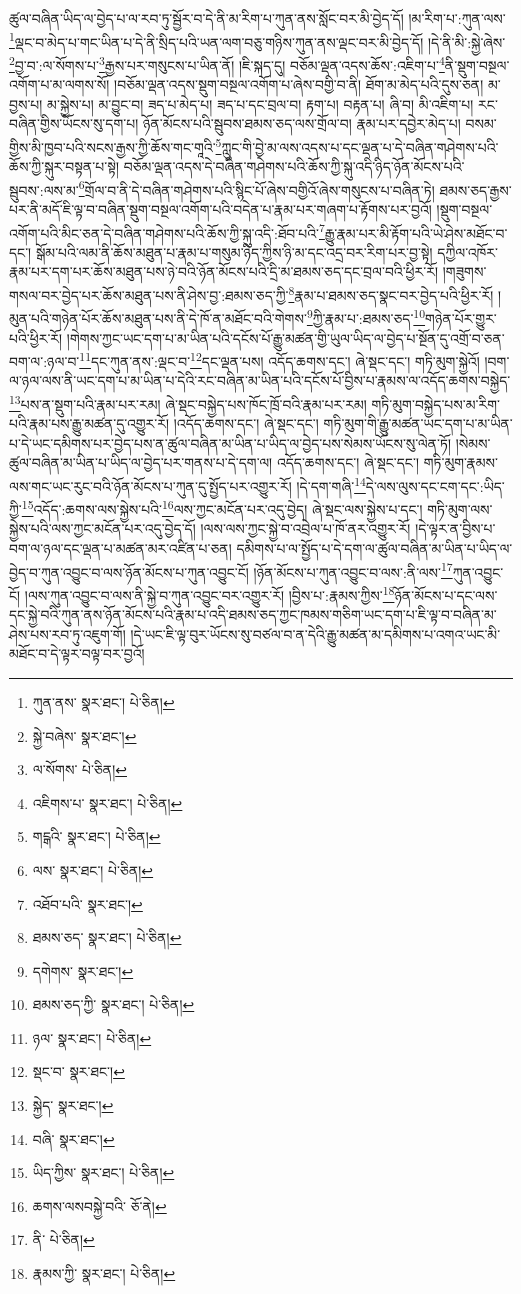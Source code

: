 ཚུལ་བཞིན་ཡིད་ལ་བྱེད་པ་ལ་རབ་ཏུ་སྦྱོར་བ་དེ་ནི་མ་རིག་པ་ཀུན་ནས་སློང་བར་མི་བྱེད་དོ། །མ་རིག་པ་:ཀུན་ལས་\footnote{ཀུན་ནས་  སྣར་ཐང་།  པེ་ཅིན། }ལྡང་བ་མེད་པ་གང་ཡིན་པ་དེ་ནི་སྲིད་པའི་ཡན་ལག་བཅུ་གཉིས་ཀུན་ནས་ལྡང་བར་མི་བྱེད་དོ། །དེ་ནི་མི་:སྐྱེ་ཞེས་\footnote{སྐྱེ་བཞེས་  སྣར་ཐང་། }བྱ་བ་:ལ་སོགས་པ་\footnote{ལ་སོགས་  པེ་ཅིན། }རྒྱས་པར་གསུངས་པ་ཡིན་ནོ། །ཇི་སྐད་དུ། བཅོམ་ལྡན་འདས་ཆོས་:འཇིག་པ་\footnote{འཇིགས་པ་  སྣར་ཐང་།  པེ་ཅིན། }ནི་སྡུག་བསྔལ་འགོག་པ་མ་ལགས་སོ། །བཅོམ་ལྡན་འདས་སྡུག་བསྔལ་འགོག་པ་ཞེས་བགྱི་བ་ནི། ཐོག་མ་མེད་པའི་དུས་ཅན། མ་བྱས་པ། མ་སྐྱེས་པ། མ་བྱུང་བ། ཟད་པ་མེད་པ། ཟད་པ་དང་བྲལ་བ། རྟག་པ། བརྟན་པ། ཞི་བ། མི་འཇིག་པ། རང་བཞིན་གྱིས་ཡོངས་སུ་དག་པ། ཉོན་མོངས་པའི་སྦུབས་ཐམས་ཅད་ལས་གྲོལ་བ། རྣམ་པར་དབྱེར་མེད་པ། བསམ་གྱིས་མི་ཁྱབ་པའི་སངས་རྒྱས་ཀྱི་ཆོས་གང་གཱའི་\footnote{གངྒའི་  སྣར་ཐང་།  པེ་ཅིན། }ཀླུང་གི་བྱེ་མ་ལས་འདས་པ་དང་ལྡན་པ་དེ་བཞིན་གཤེགས་པའི་ཆོས་ཀྱི་སྐུར་བསྟན་པ་སྟེ། བཅོམ་ལྡན་འདས་དེ་བཞིན་གཤེགས་པའི་ཆོས་ཀྱི་སྐུ་འདི་ཉིད་ཉོན་མོངས་པའི་སྦུབས་:ལས་མ་\footnote{ལས་  སྣར་ཐང་།  པེ་ཅིན། }གྲོལ་བ་ནི་དེ་བཞིན་གཤེགས་པའི་སྙིང་པོ་ཞེས་བགྱིའོ་ཞེས་གསུངས་པ་བཞིན་ཏེ། ཐམས་ཅད་རྒྱས་པར་ནི་མདོ་ཇི་ལྟ་བ་བཞིན་སྡུག་བསྔལ་འགོག་པའི་བདེན་པ་རྣམ་པར་གཞག་པ་རྟོགས་པར་བྱའོ། །སྡུག་བསྔལ་འགོག་པའི་མིང་ཅན་དེ་བཞིན་གཤེགས་པའི་ཆོས་ཀྱི་སྐུ་འདི་:ཐོབ་པའི་\footnote{འཐོབ་པའི་  སྣར་ཐང་། }རྒྱུ་རྣམ་པར་མི་རྟོག་པའི་ཡེ་ཤེས་མཐོང་བ་དང་། སྒོམ་པའི་ལམ་ནི་ཆོས་མཐུན་པ་རྣམ་པ་གསུམ་ཉིད་ཀྱིས་ཉི་མ་དང་འདྲ་བར་རིག་པར་བྱ་སྟེ། དཀྱིལ་འཁོར་རྣམ་པར་དག་པར་ཆོས་མཐུན་པས་ཉེ་བའི་ཉོན་མོངས་པའི་དྲི་མ་ཐམས་ཅད་དང་བྲལ་བའི་ཕྱིར་རོ། །གཟུགས་གསལ་བར་བྱེད་པར་ཆོས་མཐུན་པས་ནི་ཤེས་བྱ་:ཐམས་ཅད་ཀྱི་\footnote{ཐམས་ཅད་  སྣར་ཐང་།  པེ་ཅིན། }རྣམ་པ་ཐམས་ཅད་སྣང་བར་བྱེད་པའི་ཕྱིར་རོ། །མུན་པའི་གཉེན་པོར་ཆོས་མཐུན་པས་ནི་དེ་ཁོ་ན་མཐོང་བའི་གེགས་\footnote{དགེགས་  སྣར་ཐང་། }ཀྱི་རྣམ་པ་:ཐམས་ཅད་\footnote{ཐམས་ཅད་ཀྱི་  སྣར་ཐང་།  པེ་ཅིན། }གཉེན་པོར་གྱུར་པའི་ཕྱིར་རོ། །གེགས་ཀྱང་ཡང་དག་པ་མ་ཡིན་པའི་དངོས་པོ་རྒྱུ་མཚན་གྱི་ཡུལ་ཡིད་ལ་བྱེད་པ་སྔོན་དུ་འགྲོ་བ་ཅན་བག་ལ་:ཉལ་བ་\footnote{ཉལ་  སྣར་ཐང་།  པེ་ཅིན། }དང་ཀུན་ནས་:ལྡང་བ་\footnote{སྡང་བ་  སྣར་ཐང་། }དང་ལྡན་པས། འདོད་ཆགས་དང་། ཞེ་སྡང་དང་། གཏི་མུག་སྐྱེའོ། །བག་ལ་ཉལ་ལས་ནི་ཡང་དག་པ་མ་ཡིན་པ་དེའི་རང་བཞིན་མ་ཡིན་པའི་དངོས་པོ་བྱིས་པ་རྣམས་ལ་འདོད་ཆགས་བསྐྱེད་\footnote{སྐྱེད་  སྣར་ཐང་། }པས་ན་སྡུག་པའི་རྣམ་པར་རམ། ཞེ་སྡང་བསྐྱེད་པས་ཁོང་ཁྲོ་བའི་རྣམ་པར་རམ། གཏི་མུག་བསྐྱེད་པས་མ་རིག་པའི་རྣམ་པས་རྒྱུ་མཚན་དུ་འགྱུར་རོ། །འདོད་ཆགས་དང་། ཞེ་སྡང་དང་། གཏི་མུག་གི་རྒྱུ་མཚན་ཡང་དག་པ་མ་ཡིན་པ་དེ་ཡང་དམིགས་པར་བྱེད་པས་ན་ཚུལ་བཞིན་མ་ཡིན་པ་ཡིད་ལ་བྱེད་པས་སེམས་ཡོངས་སུ་ལེན་ཏོ། །སེམས་ཚུལ་བཞིན་མ་ཡིན་པ་ཡིད་ལ་བྱེད་པར་གནས་པ་དེ་དག་ལ། འདོད་ཆགས་དང་། ཞེ་སྡང་དང་། གཏི་མུག་རྣམས་ལས་གང་ཡང་རུང་བའི་ཉོན་མོངས་པ་ཀུན་དུ་སྤྱོད་པར་འགྱུར་རོ། །དེ་དག་གཞི་\footnote{བཞི་  སྣར་ཐང་། }དེ་ལས་ལུས་དང་ངག་དང་:ཡིད་ཀྱི་\footnote{ཡིད་ཀྱིས་  སྣར་ཐང་།  པེ་ཅིན། }འདོད་:ཆགས་ལས་སྐྱེས་པའི་\footnote{ཆགས་ལསབསྐྱེ་བའི་  ཅོ་ནེ། }ལས་ཀྱང་མངོན་པར་འདུ་བྱེད། ཞེ་སྡང་ལས་སྐྱེས་པ་དང་། གཏི་མུག་ལས་སྐྱེས་པའི་ལས་ཀྱང་མངོན་པར་འདུ་བྱེད་དོ། །ལས་ལས་ཀྱང་སྐྱེ་བ་འབྲེལ་པ་ཁོ་ནར་འགྱུར་རོ། །དེ་ལྟར་ན་བྱིས་པ་བག་ལ་ཉལ་དང་ལྡན་པ་མཚན་མར་འཛིན་པ་ཅན། དམིགས་པ་ལ་སྤྱོད་པ་དེ་དག་ལ་ཚུལ་བཞིན་མ་ཡིན་པ་ཡིད་ལ་བྱེད་བ་ཀུན་འབྱུང་བ་ལས་ཉོན་མོངས་པ་ཀུན་འབྱུང་ངོ། །ཉོན་མོངས་པ་ཀུན་འབྱུང་བ་ལས་:ནི་ལས་\footnote{ནི་  པེ་ཅིན། }ཀུན་འབྱུང་ངོ། །ལས་ཀུན་འབྱུང་བ་ལས་ནི་སྐྱེ་བ་ཀུན་འབྱུང་བར་འགྱུར་རོ། །བྱིས་པ་:རྣམས་ཀྱིས་\footnote{རྣམས་ཀྱི་  སྣར་ཐང་།  པེ་ཅིན། }ཉོན་མོངས་པ་དང་ལས་དང་སྐྱེ་བའི་ཀུན་ནས་ཉོན་མོངས་པའི་རྣམ་པ་འདི་ཐམས་ཅད་ཀྱང་ཁམས་གཅིག་ཡང་དག་པ་ཇི་ལྟ་བ་བཞིན་མ་ཤེས་པས་རབ་ཏུ་འཇུག་གོ། །དེ་ཡང་ཇི་ལྟ་བུར་ཡོངས་སུ་བཙལ་བ་ན་དེའི་རྒྱུ་མཚན་མ་དམིགས་པ་འགའ་ཡང་མི་མཐོང་བ་དེ་ལྟར་བལྟ་བར་བྱའོ། 